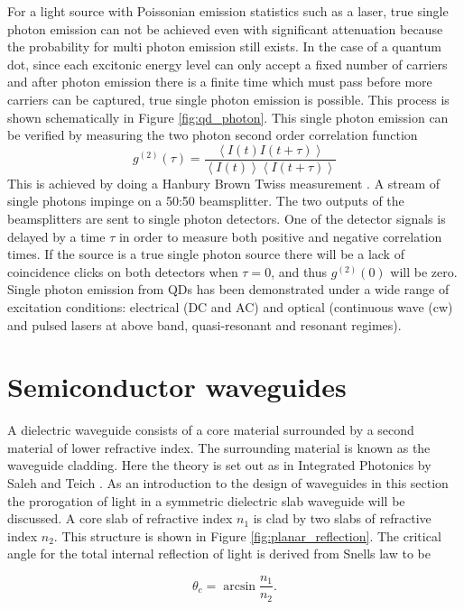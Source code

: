 For a light source with Poissonian emission statistics such as a laser, true
single photon emission can not be achieved even with significant attenuation
because the probability for multi photon emission still exists. In the case of a
quantum dot, since each excitonic energy level can only accept a fixed number of
carriers and after photon emission there is a finite time which must pass before
more carriers can be captured, true single photon emission is possible. This
process is shown schematically in Figure \ref{fig:qd_photon}. This single photon
emission can be verified by measuring the two photon second order correlation
function \begin{equation} g^{(2)}(\tau) = \frac{\left\langle I(t)I(t+\tau)
\right\rangle}{\left\langle I(t) \right\rangle \left\langle I(t+\tau)
\right\rangle} \end{equation} This is achieved by doing a Hanbury Brown Twiss
measurement \cite{brown1956test}. A stream of single photons impinge on a 50:50 beamsplitter. The two
outputs of the beamsplitters are sent to single photon detectors. One of the
detector signals is delayed by a time $\tau$ in order to measure both positive
and negative correlation times. If the source is a true single photon source
there will be a lack of coincidence clicks on both detectors when $\tau = 0$,
and thus $g^{(2)}(0)$ will be zero. Single photon emission from QDs has been
demonstrated under a wide range of excitation conditions: electrical (DC and AC)
and optical (continuous wave (cw) and pulsed lasers at above band,
quasi-resonant and resonant regimes).

\section{Semiconductor waveguides}

A dielectric waveguide consists of a core material surrounded by a second material of lower
refractive index. The surrounding material is known as the waveguide cladding.
Here the theory is set out as in Integrated Photonics by Saleh and Teich
\cite{saleh1991fundamentals}. As an introduction to the design of waveguides in
this section the prorogation of light in a symmetric dielectric slab waveguide
will be discussed. A core slab of refractive index $n_1$ is clad by two slabs of
refractive index $n_2$. This structure is shown in Figure
\ref{fig:planar_reflection}. The critical angle for the total internal
reflection of light is derived from Snells law to be

\begin{equation} \theta_c = \arcsin{\frac{n_1}{n_2}}. \end{equation}

